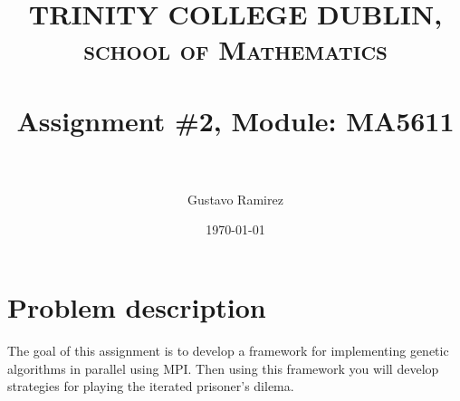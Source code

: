 \documentclass[paper=a4, fontsize=11pt]{scrartcl} %
\title{	
\normalfont \normalsize 
\textsc{TRINITY COLLEGE DUBLIN, school of Mathematics} \\ [25pt] %
\horrule{0.5pt} \\[0.4cm] %
\huge Assignment \#2, Module: MA5611 \\ %
\horrule{2pt} \\[0.5cm] %
}
\author{Gustavo Ramirez} %
\date{\normalsize\today} %
\numberwithin{equation}{section} %
\numberwithin{figure}{section} %
\numberwithin{table}{section} %
\begin{document}
\maketitle %


\section{Problem description}


The goal of this assignment is to develop a framework for implementing genetic algorithms in parallel using MPI. Then using this framework you will develop strategies for playing the iterated prisoner's dilema.
\end{document}
